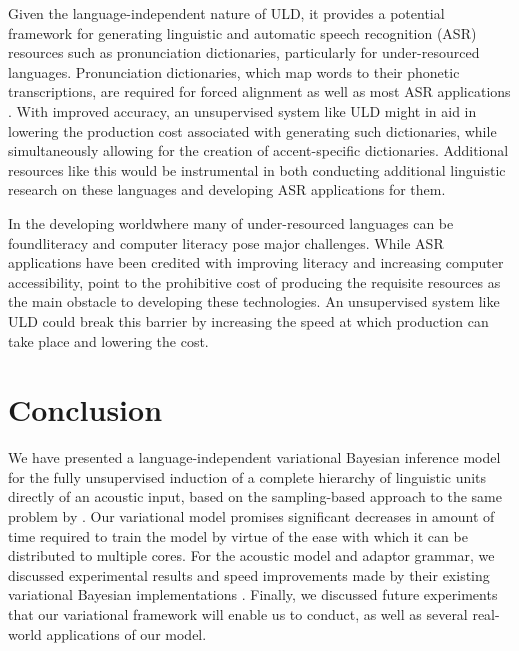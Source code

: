 \documentclass[12pt,letterpaper]{article}
\begin{document}
Given the language-independent nature of ULD, it provides a potential framework for generating linguistic and automatic speech recognition (ASR) resources such as pronunciation dictionaries, particularly for under-resourced languages. Pronunciation dictionaries, which map words to their phonetic transcriptions, are required for forced alignment as well as most ASR applications \citep{besacier:2014}. With improved accuracy, an unsupervised system like ULD might in aid in lowering the production cost associated with generating such dictionaries, while simultaneously allowing for the creation of accent-specific dictionaries. Additional resources like this would be instrumental in both conducting additional linguistic research on these languages and developing ASR applications for them. 

In the developing world\textemdash where many of under-resourced languages can be found\textemdash literacy and computer literacy pose major challenges. While ASR applications have been credited with improving literacy \citep{adams:2005} and increasing computer accessibility, \citet{plauche:2006} point to the prohibitive cost of producing the requisite resources as the main obstacle to developing these technologies. An unsupervised system like ULD could break this barrier by increasing the speed at which production can take place and lowering the cost. 

\section{Conclusion} 
We have presented a language-independent variational Bayesian inference model for the fully unsupervised induction of a complete hierarchy of linguistic units directly of an acoustic input, based on the sampling-based approach to the same problem by \citet{lee:2015}. Our variational model promises significant decreases in amount of time required to train the model by virtue of the ease with which it can be distributed to multiple cores. For the acoustic model and adaptor grammar, we discussed experimental results and speed improvements made by their existing variational Bayesian implementations \citep{ondel:2016, cohen:2010, zhai:2014}. Finally, we discussed future experiments that our variational framework will enable us to conduct, as well as several real-world applications of our model. 


\appendix




\newpage 



\end{document}
